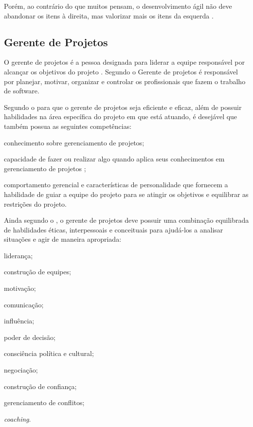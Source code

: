 \documentclass[
    12pt,               %
    openright,          %
    twoside,            %
    a4paper,            %
    chapter=TITLE,     %
    english,            %
    spanish,            %
    portuguese              %
    ]{abntex2}
\begin{document}
Porém, ao contrário do que muitos pensam, o desenvolvimento ágil não deve abandonar os itens à direita, mas valorizar mais os itens da esquerda \cite{manifesto2001}.

\subsection{Gerente de Projetos}
O gerente de projetos é a pessoa designada para liderar a equipe responsável por alcançar os objetivos do projeto \cite[p.~16]{pmi2013}. Segundo  o Gerente de projetos é responsável por planejar, motivar, organizar e controlar os profissionais que fazem o trabalho de software.

Segundo o  para que o gerente de projetos seja eficiente e eficaz, além de possuir habilidades na área específica do projeto em que está atuando, é desejável que também possua as seguintes competências:

\begin{alineas}
	\item conhecimento sobre gerenciamento de projetos;
	\item capacidade de fazer ou realizar algo quando aplica seus conhecimentos em gerenciamento de projetos ;
	\item comportamento gerencial e características de personalidade que fornecem a habilidade de guiar a equipe do projeto para se atingir os objetivos e equilibrar as restrições do projeto.
\end{alineas}

Ainda segundo o , o gerente de projetos deve possuir uma combinação equilibrada de habilidades éticas, interpessoais e conceituais para ajudá-los a analisar situações e agir de maneira apropriada:

\begin{alineas}
	\item liderança;
	\item construção de equipes;
	\item motivação;
	\item comunicação;
	\item influência;
	\item poder de decisão;
	\item consciência política e cultural;
	\item negociação;
	\item construção de confiança;
	\item gerenciamento de conflitos;
	\item \textit{coaching}.
\end{alineas}
\end{document}
